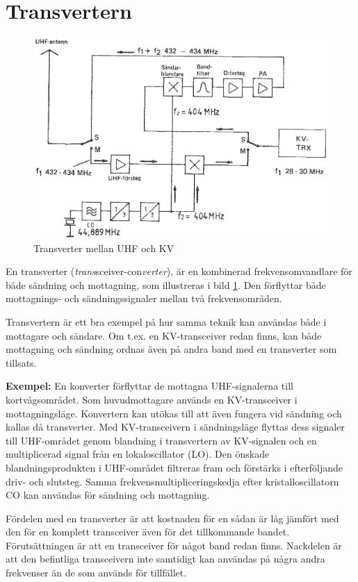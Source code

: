 \section{Transvertern}

\begin{figure}
  \includegraphics[width=\textwidth]{images/cropped_pdfs/bild_2_4-19.pdf}
  \caption{Transverter mellan UHF och KV}
  \label{fig:bildII4-19}
\end{figure}

En transverter (\emph{trans}sceiver-con\emph{verter}), är en kombinerad
frekvensomvandlare för både sändning och mottagning, som illustreras i
bild \ref{fig:bildII4-19}.
Den förflyttar både mottagnings- och sändningssignaler mellan två
frekvensområden.

Transvertern är ett bra exempel på hur samma teknik kan användas både
i mottagare och sändare.
Om t.ex. en KV-transceiver redan finns, kan både mottagning och sändning
ordnas även på andra band med en transverter som tillsats.

\textbf{Exempel:}
En konverter förflyttar de mottagna UHF-signalerna till kortvågsområdet.
Som huvudmottagare används en KV-transceiver i mottagningsläge.
Konvertern kan utökas till att även fungera vid sändning och kallas då
transverter.
Med KV-transceivern i sändningsläge flyttas dess signaler till UHF-området
genom blandning i transvertern av KV-signalen och en multiplicerad signal
från en lokaloscillator (LO).
Den önskade blandningsprodukten i UHF-området filtreras fram och förstärks i
efterföljande driv- och slutsteg.
Samma frekvensmultipliceringskedja efter kristalloscillatorn CO kan användas
för sändning och mottagning.

Fördelen med en transverter är att kostnaden för en sådan är låg jämfört med
den för en komplett transceiver även för det tillkommande bandet.
Förutsättningen är att en transceiver för något band redan finns.
Nackdelen är att den befintliga transceivern inte samtidigt kan användas på
några andra frekvenser än de som används för tillfället.
